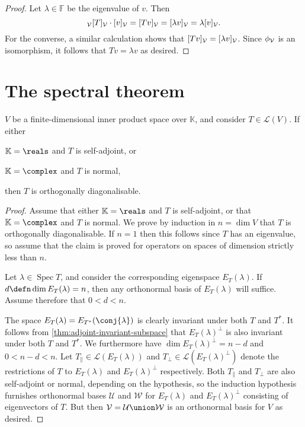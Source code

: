 \documentclass[article, a4paper, 11pt, oneside]{memoir}
\numberwithin{equation}{chapter}
\newcommand{\calL}{\mathcal{L}}
\newcommand{\calV}{\mathcal{V}}
\newcommand{\calW}{\mathcal{W}}
\newcommand{\calU}{\mathcal{U}}
\DeclareMathOperator{\spec}{Spec}
\newcommand{\field}{\mathbb{F}}
\begin{document}
\begin{proof}
    Let $\lambda \in \field$ be the eigenvalue of $v$. Then
    \begin{equation*}
        \mr{\calV}{T}{\calV} \cdot \coordvec{v}{\calV}
            = \coordvec{Tv}{\calV}
            = \coordvec{\lambda v}{\calV}
            = \lambda \coordvec{v}{\calV}.
    \end{equation*}
    For the converse, a similar calculation shows that  $\coordvec{Tv}{\calV} = \coordvec{\lambda v}{\calV}$. Since $\coordmap{\calV}$ is an isomorphism, it follows that $Tv = \lambda v$ as desired.
\end{proof}


\section{The spectral theorem}

\begin{lemma}
    \label{lem:spectral-lemma}
    $V$ be a finite-dimensional inner product space over $\mathbb{K}$, and consider $T \in \calL(V)$. If either
    \begin{enumthm}
        \item $\mathbb{K} = \reals$ and $T$ is self-adjoint, or
        \item $\mathbb{K} = \complex$ and $T$ is normal,
    \end{enumthm}
    then $T$ is orthogonally diagonalisable.
\end{lemma}

\begin{proof}
    Assume that either $\mathbb{K} = \reals$ and $T$ is self-adjoint, or that $\mathbb{K} = \complex$ and $T$ is normal. We prove by induction in $n = \dim V$ that $T$ is orthogonally diagonalisable. If $n = 1$ then this follows since $T$ has an eigenvalue, so assume that the claim is proved for operators on spaces of dimension strictly less than $n$.

    Let $\lambda \in \spec T$, and consider the corresponding eigenspace $E_T(\lambda)$. If $d \defn \dim E_T(\lambda) = n$, then any orthonormal basis of $E_T(\lambda)$ will suffice. Assume therefore that $0 < d < n$.

    The space $E_T(\lambda) = E_{T^*}(\conj{\lambda})$ is clearly invariant under both $T$ and $T^*$. It follows from \cref{thm:adjoint-invariant-subspace} that $E_T(\lambda)^\perp$ is also invariant under both $T$ and $T^*$. We furthermore have $\dim E_T(\lambda)^\perp = n-d$ and $0 < n-d < n$. Let $T_\parallel \in \calL(E_T(\lambda))$ and $T_\perp \in \calL(E_T(\lambda)^\perp)$ denote the restrictions of $T$ to $E_T(\lambda)$ and $E_T(\lambda)^\perp$ respectively. Both $T_\parallel$ and $T_\perp$ are also self-adjoint or normal, depending on the hypothesis, so the induction hypothesis furnishes orthonormal bases $\calU$ and $\calW$ for $E_T(\lambda)$ and $E_T(\lambda)^\perp$ consisting of eigenvectors of $T$. But then $\calV = \calU \union \calW$ is an orthonormal basis for $V$ as desired.
\end{proof}
\end{document}
